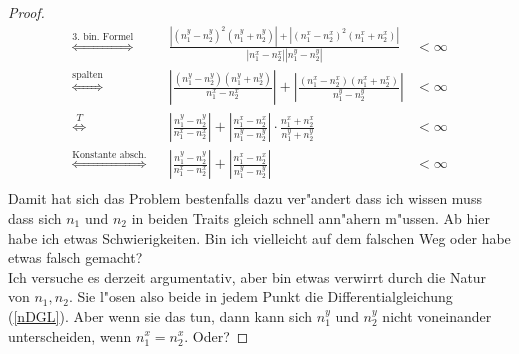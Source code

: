 \documentclass[11pt,a4paper,notitlepage]{article}
\begin{document}
\begin{proof}
\begin{align*}
		\overset{\text{3. bin. Formel}}{\Leftrightarrow} && \frac{|(n_1^y - n_2^y)^2 (n_1^y + n_2^y)| + |(n_1^x - n_2^x)^2 (n_1^x + n_2^x)|}{|n_1^x - n_2^x||n_1^y - n_2^y|} &< \infty\\
		\overset{\text{spalten}}{\Leftrightarrow} && \left| \frac{(n_1^y - n_2^y) (n_1^y + n_2^y)}{n_1^x - n_2^x} \right| + \left| \frac{(n_1^x - n_2^x) (n_1^x + n_2^x)}{n_1^y - n_2^y} \right| &< \infty\\
		\overset{T}{\Leftrightarrow} && \left| \frac{n_1^y - n_2^y}{n_1^x - n_2^x} \right|  + \left| \frac{n_1^x - n_2^x}{n_1^y - n_2^y} \right|  \cdot \frac{n_1^x + n_2^x}{n_1^y + n_2^y}&< \infty\\
		\overset{\text{Konstante absch.}}{\Leftrightarrow} && \left| \frac{n_1^y - n_2^y}{n_1^x - n_2^x} \right|  + \left| \frac{n_1^x - n_2^x}{n_1^y - n_2^y} \right|  &< \infty\\
	\end{align*}
	Damit hat sich das Problem bestenfalls dazu ver"andert dass ich wissen muss dass sich $ n_1 $ und $ n_2 $ in beiden Traits gleich schnell ann"ahern m"ussen. Ab hier habe ich etwas Schwierigkeiten. Bin ich vielleicht auf dem falschen Weg oder habe etwas falsch gemacht?\\
	Ich versuche es derzeit argumentativ, aber bin etwas verwirrt durch die Natur von $ n_1, n_2 $. Sie l"osen also beide in jedem Punkt die Differentialgleichung (\ref{nDGL}). Aber wenn sie das tun, dann kann sich $ n_1^y $ und $ n_2^y $ nicht voneinander unterscheiden, wenn $ n_1^x = n_2^x $. Oder?
%	
	
\end{proof}
\end{document}

